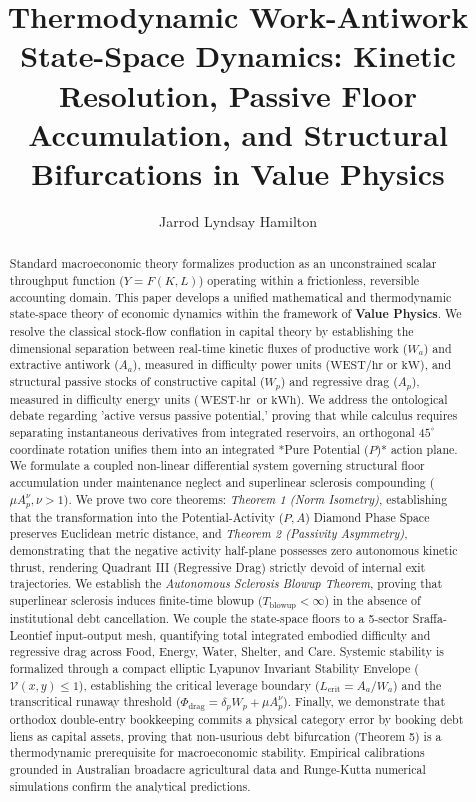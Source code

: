 \documentclass[preprint,12pt,authoryear]{elsarticle}
\theoremstyle{definition}
\begin{document}
\begin{frontmatter}

\title{Thermodynamic Work-Antiwork State-Space Dynamics: Kinetic Resolution, Passive Floor Accumulation, and Structural Bifurcations in Value Physics}

\author{Jarrod Lyndsay Hamilton}
\address{Alethekanon Research Institute --- Division 2: Societal Economics \& Macro-Micro Simulation, Australia}

\begin{abstract}
Standard macroeconomic theory formalizes production as an unconstrained scalar throughput function ($Y = F(K, L)$) operating within a frictionless, reversible accounting domain. This paper develops a unified mathematical and thermodynamic state-space theory of economic dynamics within the framework of \textbf{Value Physics}. We resolve the classical stock-flow conflation in capital theory by establishing the dimensional separation between real-time kinetic fluxes of productive work ($W_a$) and extractive antiwork ($A_a$), measured in difficulty power units ($ \text{WEST/hr}$ or $ \text{kW}$), and structural passive stocks of constructive capital ($W_p$) and regressive drag ($A_p$), measured in difficulty energy units ($ \text{WEST}\cdot \text{hr}$ or $ \text{kWh}$). We address the ontological debate regarding 'active versus passive potential,' proving that while calculus requires separating instantaneous derivatives from integrated reservoirs, an orthogonal $45^\circ$ coordinate rotation unifies them into an integrated *Pure Potential ($P$)* action plane. We formulate a coupled non-linear differential system governing structural floor accumulation under maintenance neglect and superlinear sclerosis compounding ($\mu A_p^\nu,\nu > 1$). We prove two core theorems: \textit{Theorem 1 (Norm Isometry)}, establishing that the transformation into the Potential-Activity ($P, A$) Diamond Phase Space preserves Euclidean metric distance, and \textit{Theorem 2 (Passivity Asymmetry)}, demonstrating that the negative activity half-plane possesses zero autonomous kinetic thrust, rendering Quadrant III (Regressive Drag) strictly devoid of internal exit trajectories. We establish the \textit{Autonomous Sclerosis Blowup Theorem}, proving that superlinear sclerosis induces finite-time blowup ($T_{ \text{blowup}} < \infty$) in the absence of institutional debt cancellation. We couple the state-space floors to a 5-sector Sraffa-Leontief input-output mesh, quantifying total integrated embodied difficulty and regressive drag across Food, Energy, Water, Shelter, and Care. Systemic stability is formalized through a compact elliptic Lyapunov Invariant Stability Envelope ($\mathcal{V}(x, y) \le 1$), establishing the critical leverage boundary ($L_{ \text{crit}} = A_a / W_a$) and the transcritical runaway threshold ($\Phi_{ \text{drag}} = \delta_p W_p + \mu A_p^\nu$). Finally, we demonstrate that orthodox double-entry bookkeeping commits a physical category error by booking debt liens as capital assets, proving that non-usurious debt bifurcation (Theorem 5) is a thermodynamic prerequisite for macroeconomic stability. Empirical calibrations grounded in Australian broadacre agricultural data and Runge-Kutta numerical simulations confirm the analytical predictions.

\end{abstract}
\end{frontmatter}
\end{document}
